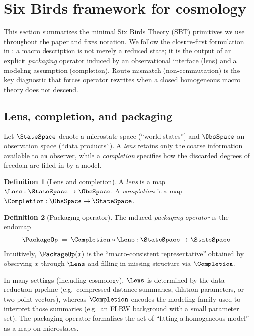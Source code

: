 \documentclass[11pt]{article}
\theoremstyle{definition}
\newtheorem{definition}{Definition}[section]
\theoremstyle{plain}
\theoremstyle{remark}
\begin{document}
\section{Six Birds framework for cosmology}\label{sec:framework}
This section summarizes the minimal Six Birds Theory (SBT) primitives we use throughout the paper and fixes notation.
We follow the closure-first formulation in \cite{Tsiokos2026SixBirds,Tsiokos2026WakeStone}: a macro description is not merely a reduced state; it is the output of an explicit \emph{packaging} operator induced by an observational interface (lens) and a modeling assumption (completion).
Route mismatch (non-commutation) is the key diagnostic that forces operator rewrites when a closed homogeneous macro theory does not descend.

\subsection{Lens, completion, and packaging}\label{sec:framework:packaging}
Let $\StateSpace$ denote a microstate space (``world states'') and $\ObsSpace$ an observation space (``data products'').
A \emph{lens} retains only the coarse information available to an observer, while a \emph{completion} specifies how the discarded degrees of freedom are filled in by a model.

\begin{definition}[Lens and completion]
A \emph{lens} is a map $\Lens:\StateSpace\to\ObsSpace$.
A \emph{completion} is a map $\Completion:\ObsSpace\to\StateSpace$.
\end{definition}

\begin{definition}[Packaging operator]
The induced \emph{packaging operator} is the endomap
\begin{equation}
\PackageOp \;=\; \Completion\circ \Lens:\StateSpace\to\StateSpace.
\label{eq:packaging_def}
\end{equation}
Intuitively, $\PackageOp(x)$ is the ``macro-consistent representative'' obtained by observing $x$ through $\Lens$ and filling in missing structure via $\Completion$.
\end{definition}

In many settings (including cosmology), $\Lens$ is determined by the data reduction pipeline (e.g.\ compressed distance summaries, dilation parameters, or two-point vectors), whereas $\Completion$ encodes the modeling family used to interpret those summaries (e.g.\ an FLRW background with a small parameter set).
The packaging operator formalizes the act of ``fitting a homogeneous model'' as a map on microstates.
\end{document}
